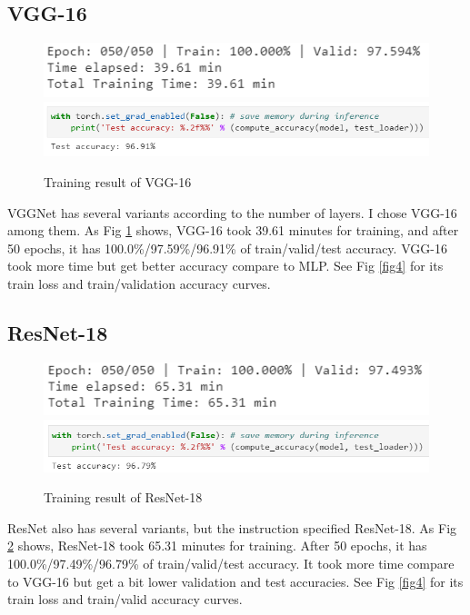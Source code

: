 \documentclass[11pt]{article}
\begin{document}
\subsection{VGG-16}
    \begin{figure}[H]
        \includegraphics[width=0.8\linewidth]{img/VGG/final.PNG}
        \includegraphics[width=1\linewidth]{img/VGG/test.PNG}
        \caption{Training result of VGG-16}
        \label{fig2}
    \end{figure}
    VGGNet has several variants according to the number of layers. I chose VGG-16 among them. As Fig \ref{fig2} shows, VGG-16 took 39.61 minutes for training, and after 50 epochs, it has 100.0\%/97.59\%/96.91\% of train/valid/test accuracy. VGG-16 took more time but get better accuracy compare to MLP. See Fig \ref{fig4} for its train loss and train/validation accuracy curves.

\subsection{ResNet-18}
    \begin{figure}[H]
        \includegraphics[width=0.8\linewidth]{img/Res/final.PNG}
        \includegraphics[width=1\linewidth]{img/Res/test.PNG}
        \caption{Training result of ResNet-18}
        \label{fig3}
    \end{figure}
    ResNet also has several variants, but the instruction specified ResNet-18. As Fig \ref{fig3} shows, ResNet-18 took 65.31 minutes for training. After 50 epochs, it has 100.0\%/97.49\%/96.79\% of train/valid/test accuracy. It took more time compare to VGG-16 but get a bit lower validation and test accuracies. See Fig \ref{fig4} for its train loss and train/valid accuracy curves.
\end{document}
